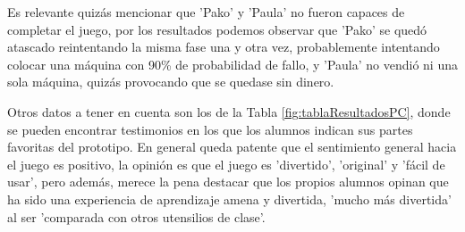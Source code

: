Es relevante quizás mencionar que 'Pako' y 'Paula' no fueron capaces de completar el juego, por los resultados podemos observar que 'Pako' se quedó atascado reintentando la misma fase una y otra vez, probablemente intentando colocar una máquina con 90\% de probabilidad de fallo, y 'Paula' no vendió ni una sola máquina, quizás provocando que se quedase sin dinero.

Otros datos a tener en cuenta son los de la Tabla \ref{fig:tablaResultadosPC}, donde se pueden encontrar testimonios en los que los alumnos indican sus partes favoritas del prototipo. En general queda patente que el sentimiento general hacia el juego es positivo, la opinión es que el juego es 'divertido', 'original' y 'fácil de usar', pero además, merece la pena destacar que los propios alumnos opinan que ha sido una experiencia de aprendizaje amena y divertida, 'mucho más divertida' al ser 'comparada con otros utensilios de clase'.